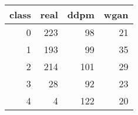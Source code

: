 \begin{tabular}{rrrr}
\toprule
class & real & ddpm & wgan \\
\midrule
0 & 223 & 98 & 21 \\
1 & 193 & 99 & 35 \\
2 & 214 & 101 & 29 \\
3 & 28 & 92 & 23 \\
4 & 4 & 122 & 20 \\
\bottomrule
\end{tabular}
